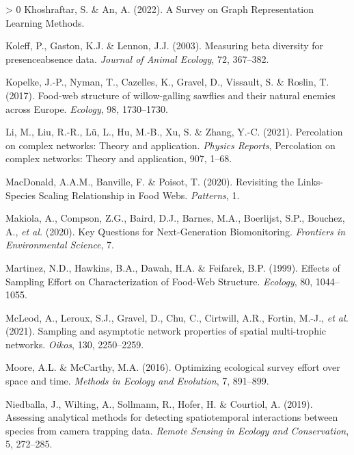 \documentclass[11pt]{article}
\newlength{\cslhangindent}
\newenvironment{CSLReferences}[3] %
 {%
  \setlength{\parindent}{0pt}
  \ifodd #1 \everypar{\setlength{\hangindent}{\cslhangindent}}\ignorespaces\fi
  \ifnum #2 > 0
  \setlength{\parskip}{#2\baselineskip}
  \fi
 }%
 {}
\begin{document}
\begin{CSLReferences}{1}{0}
\leavevmode\hypertarget{ref-Khoshraftar2022SurGra}{}%
Khoshraftar, S. \& An, A. (2022). A Survey on Graph Representation
Learning Methods.

\leavevmode\hypertarget{ref-Koleff2003MeaBet}{}%
Koleff, P., Gaston, K.J. \& Lennon, J.J. (2003). Measuring beta
diversity for presenceabsence data. \emph{Journal of Animal Ecology},
72, 367--382.

\leavevmode\hypertarget{ref-Kopelke2017FooStr}{}%
Kopelke, J.-P., Nyman, T., Cazelles, K., Gravel, D., Vissault, S. \&
Roslin, T. (2017). Food-web structure of willow-galling sawflies and
their natural enemies across Europe. \emph{Ecology}, 98, 1730--1730.

\leavevmode\hypertarget{ref-Li2021PerCom}{}%
Li, M., Liu, R.-R., Lü, L., Hu, M.-B., Xu, S. \& Zhang, Y.-C. (2021).
Percolation on complex networks: Theory and application. \emph{Physics
Reports}, Percolation on complex networks: Theory and application, 907,
1--68.

\leavevmode\hypertarget{ref-MacDonald2020RevLin}{}%
MacDonald, A.A.M., Banville, F. \& Poisot, T. (2020). Revisiting the
Links-Species Scaling Relationship in Food Webs. \emph{Patterns}, 1.

\leavevmode\hypertarget{ref-Makiola2020KeyQue}{}%
Makiola, A., Compson, Z.G., Baird, D.J., Barnes, M.A., Boerlijst, S.P.,
Bouchez, A., \emph{et al.} (2020). Key Questions for Next-Generation
Biomonitoring. \emph{Frontiers in Environmental Science}, 7.

\leavevmode\hypertarget{ref-Martinez1999EffSam}{}%
Martinez, N.D., Hawkins, B.A., Dawah, H.A. \& Feifarek, B.P. (1999).
Effects of Sampling Effort on Characterization of Food-Web Structure.
\emph{Ecology}, 80, 1044--1055.

\leavevmode\hypertarget{ref-McLeod2021SamAsy}{}%
McLeod, A., Leroux, S.J., Gravel, D., Chu, C., Cirtwill, A.R., Fortin,
M.-J., \emph{et al.} (2021). Sampling and asymptotic network properties
of spatial multi-trophic networks. \emph{Oikos}, 130, 2250--2259.

\leavevmode\hypertarget{ref-Moore2016OptEco}{}%
Moore, A.L. \& McCarthy, M.A. (2016). Optimizing ecological survey
effort over space and time. \emph{Methods in Ecology and Evolution}, 7,
891--899.

\leavevmode\hypertarget{ref-Niedballa2019AssAna}{}%
Niedballa, J., Wilting, A., Sollmann, R., Hofer, H. \& Courtiol, A.
(2019). Assessing analytical methods for detecting spatiotemporal
interactions between species from camera trapping data. \emph{Remote
Sensing in Ecology and Conservation}, 5, 272--285.


\end{CSLReferences}
\end{document}
